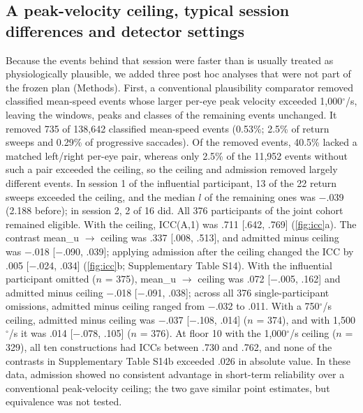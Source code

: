 

\subsection{A peak-velocity ceiling, typical session differences and detector settings}

Because the events behind that session were faster than is usually treated as physiologically plausible, we added three post hoc analyses that were not part of the frozen plan (Methods). First, a conventional plausibility comparator removed classified mean-speed events whose larger per-eye peak velocity exceeded 1,000$^\circ$/s, leaving the windows, peaks and classes of the remaining events unchanged. It removed 735 of 138,642 classified mean-speed events (0.53\%; 2.5\% of return sweeps and 0.29\% of progressive saccades). Of the removed events, 40.5\% lacked a matched left/right per-eye pair, whereas only 2.5\% of the 11,952 events without such a pair exceeded the ceiling, so the ceiling and admission removed largely different events. In session 1 of the influential participant, 13 of the 22 return sweeps exceeded the ceiling, and the median $l$ of the remaining ones was $-$.039 (2.188 before); in session 2, 2 of 16 did. All 376 participants of the joint cohort remained eligible. With the ceiling, ICC(A,1) was .711 [.642, .769] (\cref{fig:icc}a). The contrast mean\_u $\to$ ceiling was .337 [.008, .513], and admitted minus ceiling was $-$.018 [$-$.090, .039]; applying admission after the ceiling changed the ICC by .005 [$-$.024, .034] (\cref{fig:icc}b; Supplementary Table S14). With the influential participant omitted ($n$ = 375), mean\_u $\to$ ceiling was .072 [$-$.005, .162] and admitted minus ceiling $-$.018 [$-$.091, .038]; across all 376 single-participant omissions, admitted minus ceiling ranged from $-$.032 to .011. With a 750$^\circ$/s ceiling, admitted minus ceiling was $-$.037 [$-$.108, .014] ($n$ = 374), and with 1,500$^\circ$/s it was .014 [$-$.078, .105] ($n$ = 376). At floor 10 with the 1,000$^\circ$/s ceiling ($n$ = 329), all ten constructions had ICCs between .730 and .762, and none of the contrasts in Supplementary Table S14b exceeded .026 in absolute value. In these data, admission showed no consistent advantage in short-term reliability over a conventional peak-velocity ceiling; the two gave similar point estimates, but equivalence was not tested.

